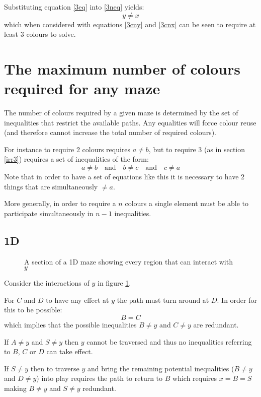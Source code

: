 \documentclass[10pt,twocolumn]{article}
\begin{document}
Substituting equation \ref{3eq} into \ref{3neq} yields:
\begin{equation}y \neq x \label{3ynx}\end{equation}
which when considered with equations \ref{3cny} and \ref{3cnx} can be seen to
require at least 3 colours to solve.

\section{The maximum number of colours required for any maze}
The number of colours required by a given maze is determined by the set of
inequalities that restrict the available paths.
Any equalities will force colour reuse (and therefore cannot increase the total
number of required colours).

For instance to require 2 colours requires $a \neq b$, but to require 3 (as in
section \ref{irr3}) requires a set of inequalities of the form:
\begin{equation}
a \neq b
\quad \textrm{and} \quad
b \neq c
\quad \textrm{and} \quad
c \neq a
\end{equation}
Note that in order to have a set of equations like this it is necessary to have
2 things that are simultaneously $\neq a$.

More generally, in order to require a $n$ colours a single element must be able
to participate simultaneously in $n-1$ inequalities.

\subsection{1D}
\begin{figure}
\caption{A section of a 1D maze showing every region that can interact with $y$}
\centering

\label{1dall}
\end{figure}
Consider the interactions of $y$ in figure \ref{1dall}.

For $C$ and $D$ to have any effect at $y$ the path must turn around at $D$.
In order for this to be possible:
\begin{equation} B = C \end{equation}
which implies that the possible inequalities $B \neq y$ and $C \neq y$ are
redundant.

If $A \neq y$ and $S \neq y$ then $y$ cannot be traversed and thus no
inequalities referring to $B$, $C$ or $D$ can take effect.

If $S \neq y$ then to traverse $y$ and bring the remaining potential
inequalities ($B \neq y$ and $D \neq y$) into play requires the path to return
to $B$ which requires $x = B = S$ making $B \neq y$ and $S \neq y$ redundant.
\end{document}
